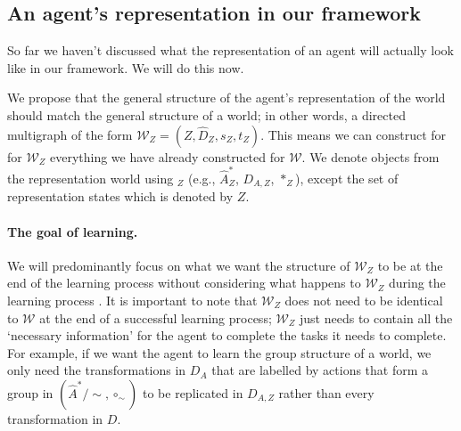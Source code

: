 \subsection{An agent's representation in our framework}

So far we haven't discussed what the representation of an agent will actually look like in our framework.
We will do this now.

We propose that the general structure of the agent's representation of the world should match the general structure of a world; in other words, a directed multigraph of the form $\mathscr{W}_{Z} = (Z, \hat{D}_{Z}, s_{Z}, t_{Z})$.
This means we can construct for for $\mathscr{W}_{Z}$ everything we have already constructed for $\mathscr{W}$.
We denote objects from the representation world using $_{Z}$ (e.g., $\hat{A}^{\ast}_{Z}$, $D_{A, Z}$, $\ast_{Z}$), except the set of representation states which is denoted by $Z$.

\paragraph{The goal of learning.}
We will predominantly focus on what we want the structure of $\mathscr{W}_{Z}$ to be at the end of the learning process without considering what happens to $\mathscr{W}_{Z}$ during the learning process .
It is important to note that $\mathscr{W}_{Z}$ does not need to be identical to $\mathscr{W}$ at the end of a successful learning process; $\mathscr{W}_{Z}$ just needs to contain all the `necessary information' for the agent to complete the tasks it needs to complete.
For example, if we want the agent to learn the group structure of a world, we only need the transformations in $D_{A}$ that are labelled by actions that form a group in $(\hat{A}^{*}/\sim, \circ_{\sim})$ to be replicated in $D_{A, Z}$ rather than every transformation in $D$.



